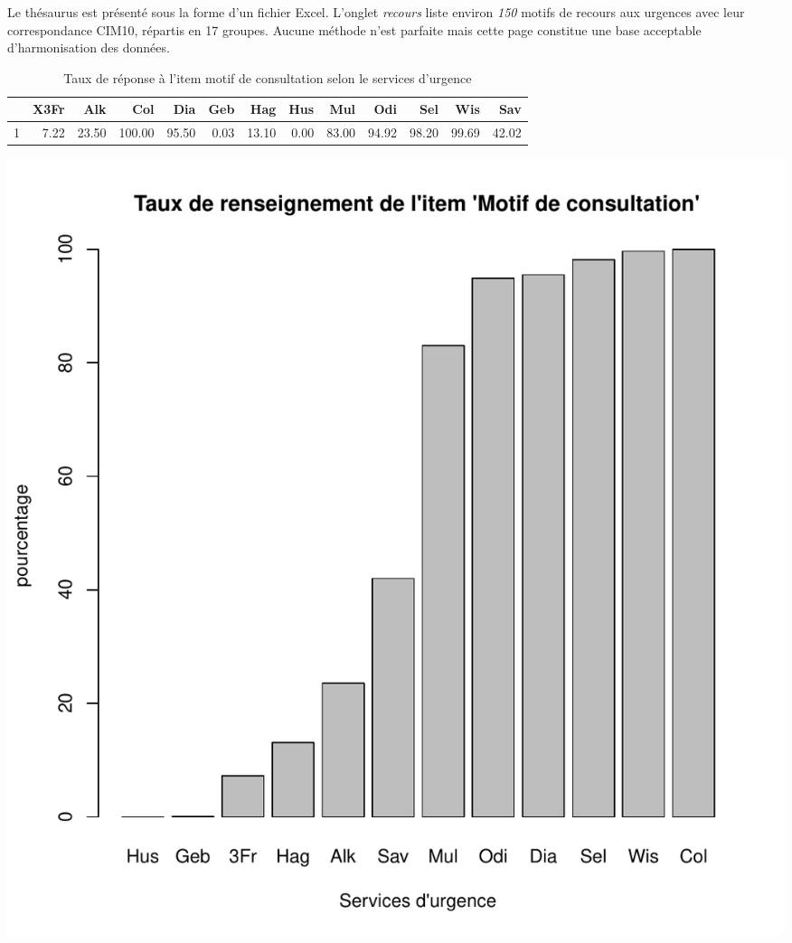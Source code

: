 \documentclass[12pt,english,french,twoside]{book}\usepackage[]{graphicx}\usepackage[]{color}
\makeatletter
\def\maxwidth{ %
  \ifdim\Gin@nat@width>\linewidth
    \linewidth
  \else
    \Gin@nat@width
  \fi
}
\makeatother
\begin{document}
Le thésaurus est présenté sous la forme d'un fichier Excel. L'onglet \emph{recours} liste environ \emph{150} motifs de recours aux urgences avec leur correspondance CIM10, répartis en 17 groupes. Aucune méthode n'est parfaite mais cette page constitue une base acceptable d'harmonisation des données.


\begin{table}[ht]
\centering
\begin{tabular}{rrrrrrrrrrrrr}
  \hline
 & X3Fr & Alk & Col & Dia & Geb & Hag & Hus & Mul & Odi & Sel & Wis & Sav \\ 
  \hline
1 & 7.22 & 23.50 & 100.00 & 95.50 & 0.03 & 13.10 & 0.00 & 83.00 & 94.92 & 98.20 & 99.69 & 42.02 \\ 
   \hline
\end{tabular}
\caption[Motif de consultation]{Taux de réponse à l'item motif de consultation selon le services d'urgence} 
\label{lab:motif}
\end{table}

\includegraphics[width=\maxwidth]{figure/motifss1} 
\end{document}
